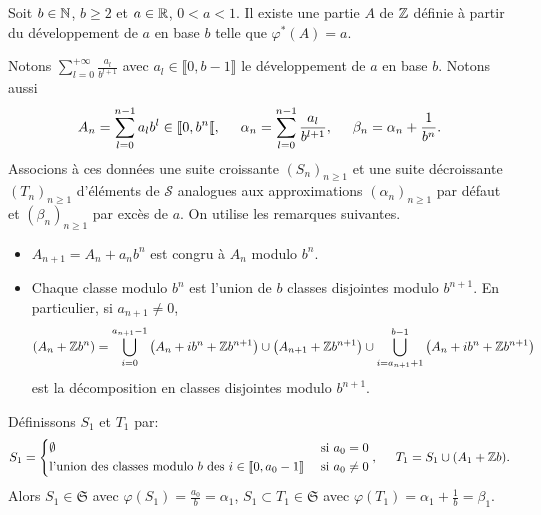 \begin{exple}[2]
 Soit $b\in \mathbb{N}$, $b \geq 2$ et $a \in \mathbb{R}$, $0 < a < 1$. Il existe une partie $A$ de $\mathbb{Z}$ définie à partir du développement de $a$ en base $b$ telle que $\varphi^*(A) = a$.
\end{exple}
\begin{demo}
Notons $\sum_{l=0}^{+ \infty}\frac{a_l}{b^{l+1}}$ avec $a_l \in \llbracket 0, b-1 \rrbracket$ le développement de $a$ en base $b$.
Notons aussi
\begin{displaymath}
 A_n = \sum_{l=0}^{n-1}a_l b^l \in \llbracket 0 , b^n \llbracket, \hspace{0.5cm} \alpha_n = \sum_{l=0}^{n-1}\frac{a_l}{b^{l+1}}
 , \hspace{0.5cm} \beta_n = \alpha_n + \frac{1}{b^n}.
\end{displaymath}
Associons à ces données une suite croissante $(S_n)_{n\geq 1}$ et une suite décroissante $(T_n)_{n\geq 1}$ d'éléments de $\mathcal{S}$ analogues aux approximations $(\alpha_n)_{n\geq 1}$ par défaut et $(\beta_n)_{n\geq 1}$ par excès de $a$. On utilise les remarques suivantes.
  \begin{itemize}
   \item $A_{n + 1} = A_n + a_n b^n$ est congru à $A_{n}$ modulo $b^{n}$.
   \item Chaque classe modulo $b^n$ est l'union de $b$ classes disjointes modulo $b^{n+1}$. En particulier, si $a_{n+1}\neq 0$,
   \begin{displaymath}
    \left( A_n + \mathbb{Z} b^n\right) = \bigcup_{i = 0}^{a_{n+1}-1}\left( A_n + i b^n + \mathbb{Z} b^{n+1}\right)
                                 \cup \left( A_{n+1} + \mathbb{Z} b^{n+1}\right)
                                 \cup \bigcup_{i = a_{n+1}+1}^{b-1}\left( A_n + i b^n + \mathbb{Z} b^{n+1}\right)
   \end{displaymath}
   est la décomposition en classes disjointes modulo $b^{n+1}$.
  \end{itemize}
\noindent Définissons $S_1$ et $T_1$ par:
\begin{displaymath}
  S_1 = \left\lbrace
   \begin{aligned}
     & \emptyset &\text{ si } a_0 = 0 \\
     &\text{l'union des classes modulo } b \text{ des } i \in \llbracket 0, a_0-1\rrbracket &\text{ si } a_0 \neq 0
   \end{aligned}
  \right., \hspace{0.5cm} T_1 = S_1 \cup (A_1 + \mathbb{Z} b).
\end{displaymath}
Alors $S_1 \in \mathfrak{S}$ avec $\varphi(S_1) = \frac{a_0}{b} = \alpha_1$, $S_1 \subset T_1 \in \mathfrak{S}$ avec $\varphi(T_1) = \alpha_1 + \frac{1}{b} = \beta_1$.\newline

\end{demo}
